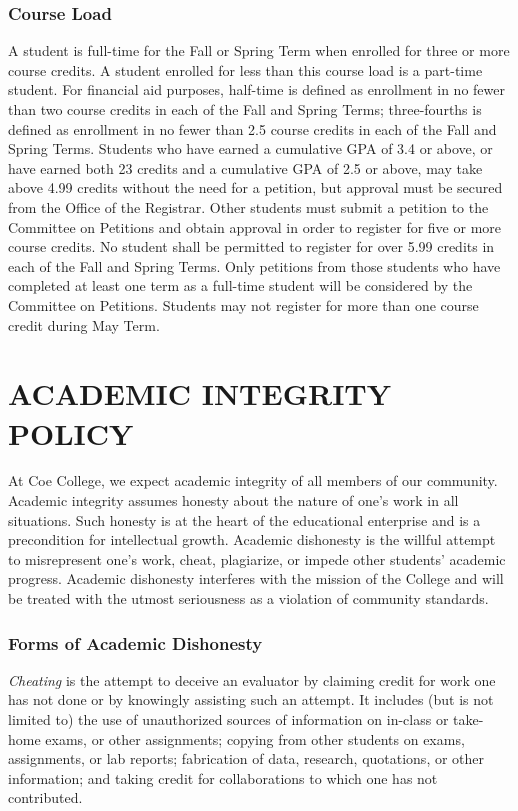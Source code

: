 \documentclass[
  letterpaper,
]{scrbook}
\begin{document}
\subsection{Course Load}\label{sec-course-load}

A student is full-time for the Fall or Spring Term when enrolled for
three or more course credits. A student enrolled for less than this
course load is a part-time student. For financial aid purposes,
half-time is defined as enrollment in no fewer than two course credits
in each of the Fall and Spring Terms; three-fourths is defined as
enrollment in no fewer than 2.5 course credits in each of the Fall and
Spring Terms. Students who have earned a cumulative GPA of 3.4 or above,
or have earned both 23 credits and a cumulative GPA of 2.5 or above, may
take above 4.99 credits without the need for a petition, but approval
must be secured from the Office of the Registrar. Other students must
submit a petition to the Committee on Petitions and obtain approval in
order to register for five or more course credits. No student shall be
permitted to register for over 5.99 credits in each of the Fall and
Spring Terms. Only petitions from those students who have completed at
least one term as a full-time student will be considered by the
Committee on Petitions. Students may not register for more than one
course credit during May Term.

\chapter{ACADEMIC INTEGRITY POLICY}\label{academic-integrity-policy}

At Coe College, we expect academic integrity of all members of our
community. Academic integrity assumes honesty about the nature of one's
work in all situations. Such honesty is at the heart of the educational
enterprise and is a precondition for intellectual growth. Academic
dishonesty is the willful attempt to misrepresent one's work, cheat,
plagiarize, or impede other students' academic progress. Academic
dishonesty interferes with the mission of the College and will be
treated with the utmost seriousness as a violation of community
standards.

\subsection{Forms of Academic
Dishonesty}\label{forms-of-academic-dishonesty}

\emph{Cheating} is the attempt to deceive an evaluator by claiming
credit for work one has not done or by knowingly assisting such an
attempt. It includes (but is not limited to) the use of unauthorized
sources of information on in-class or take-home exams, or other
assignments; copying from other students on exams, assignments, or lab
reports; fabrication of data, research, quotations, or other
information; and taking credit for collaborations to which one has not
contributed.
\end{document}
